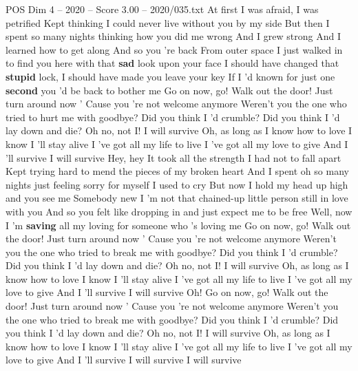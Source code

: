 \begin{textsample}{POS Dim 4 – 2020 – Score 3.00 – 2020/035.txt}  \label{ex:f4_pos_021}
At first I was afraid, I was petrified Kept thinking I could never live without you by my side But then I spent so many nights thinking how you did me wrong And I grew strong And I learned how to get along And so you 're back From outer space I just walked in to find you here with that \textbf{sad} look upon your face I should have changed that \textbf{stupid} lock, I should have made you leave your key If I 'd known for just one \textbf{second} you 'd be back to bother me Go on now, go!
Walk out the door!
Just turn around now ' Cause you 're not welcome anymore Weren't you the one who tried to hurt me with goodbye?
Did you think I 'd crumble?
Did you think I 'd lay down and die?
Oh no, not I!
I will survive Oh, as long as I know how to love I know I 'll stay alive I 've got all my life to live I 've got all my love to give And I 'll survive I will survive Hey, hey It took all the strength I had not to fall apart Kept trying hard to mend the pieces of my broken heart And I spent oh so many nights just feeling sorry for myself I used to cry But now I hold my head up high and you see me Somebody new I 'm not that chained-up little person still in love with you And so you felt like dropping in and just expect me to be free Well, now I 'm \textbf{saving} all my loving for someone who 's loving me Go on now, go!
Walk out the door!
Just turn around now ' Cause you 're not welcome anymore Weren't you the one who tried to break me with goodbye?
Did you think I 'd crumble?
Did you think I 'd lay down and die?
Oh no, not I!
I will survive Oh, as long as I know how to love I know I 'll stay alive I 've got all my life to live I 've got all my love to give And I 'll survive I will survive Oh!
Go on now, go!
Walk out the door!
Just turn around now ' Cause you 're not welcome anymore Weren't you the one who tried to break me with goodbye?
Did you think I 'd crumble?
Did you think I 'd lay down and die?
Oh no, not I!
I will survive Oh, as long as I know how to love I know I 'll stay alive I 've got all my life to live I 've got all my love to give And I 'll survive I will survive I will survive

\end{textsample}
